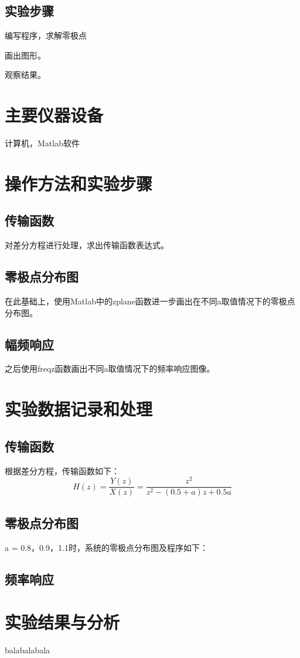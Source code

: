 \documentclass{zjureport}
\begin{document}
  \subsection{实验步骤}
    \begin{clause}
      \item 编写程序，求解零极点
      \item 画出图形。
      \item 观察结果。
    \end{clause}

\section{主要仪器设备}
  计算机，Matlab软件

\section{操作方法和实验步骤}
  \subsection{传输函数}
    对差分方程进行处理，求出传输函数表达式。
  \subsection{零极点分布图}
    在此基础上，使用Matlab中的zplane函数进一步画出在不同a取值情况下的零极点分布图。
  \subsection{幅频响应}
    之后使用freqz函数画出不同a取值情况下的频率响应图像。

\section{实验数据记录和处理}
  \subsection{传输函数}
    根据差分方程，传输函数如下：
    $$H(z) = \frac{Y(z)}{X(z)} = \frac{z^2}{z^2-(0.5+a)z+0.5a}$$
  \subsection{零极点分布图}
    a = 0.8，0.9，1.1时，系统的零极点分布图及程序如下：


  \subsection{频率响应}



\section{实验结果与分析}

balabalabala
\end{document}
